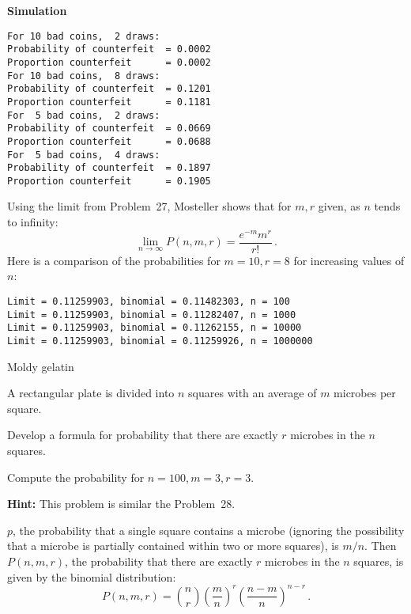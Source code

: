 \textbf{Simulation}
\begin{verbatim}
For 10 bad coins,  2 draws:
Probability of counterfeit  = 0.0002
Proportion counterfeit      = 0.0002
For 10 bad coins,  8 draws:
Probability of counterfeit  = 0.1201
Proportion counterfeit      = 0.1181
For  5 bad coins,  2 draws:
Probability of counterfeit  = 0.0669
Proportion counterfeit      = 0.0688
For  5 bad coins,  4 draws:
Probability of counterfeit  = 0.1897
Proportion counterfeit      = 0.1905
\end{verbatim}

Using the limit from Problem~27, Mosteller shows that for $m,r$ given, as $n$ tends to infinity:
\begin{equation}\label{eq.bin-limit}
\lim_{n\rightarrow \infty}P(n,m,r) = \frac{e^{-m}m^r}{r!}\,.
\end{equation}
Here is a comparison of the probabilities for $m=10, r=8$ for increasing values of $n$:

\begin{verbatim}
Limit = 0.11259903, binomial = 0.11482303, n = 100
Limit = 0.11259903, binomial = 0.11282407, n = 1000
Limit = 0.11259903, binomial = 0.11262155, n = 10000
Limit = 0.11259903, binomial = 0.11259926, n = 1000000
\end{verbatim}


\begin{prob}{Moldy gelatin}

A rectangular plate is divided into $n$ squares with an average of $m$ microbes per square.

 Develop a formula for probability that there are exactly $r$ microbes in the $n$ squares.

 Compute the probability for $n=100, m=3, r=3$.

\textbf{Hint:} This problem is similar the Problem~28.

\end{prob}

\solution{}

$p$, the probability that a single square contains a microbe (ignoring the possibility that a microbe is partially contained within two or more squares), is $m/n$. Then $P(n,m,r)$, the probability that there are exactly $r$ microbes in the $n$ squares, is given by the binomial distribution:
\[
P(n,m,r) = {n \choose r} \left(\frac{m}{n}\right)^r \left(\frac{n-m}{n}\right)^{n-r}\,.
\]

